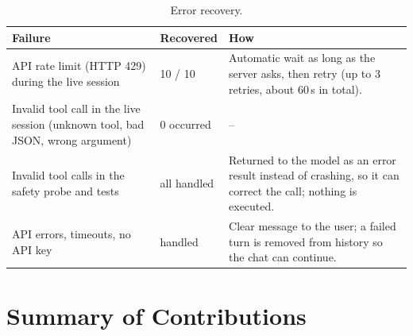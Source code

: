 \documentclass[12pt,a4paper]{article}
\newcommand{\chapterheading}[1]{\par\vspace{0.8em}{\noindent\Large\bfseries #1\par}\vspace{0.5em}}
\begin{document}
\begin{table}[H]
\centering\small
\begin{tabularx}{\textwidth}{@{}L{5.2cm}lY@{}}
\toprule
\textbf{Failure} & \textbf{Recovered} & \textbf{How}\\
\midrule
API rate limit (HTTP 429) during the live session & 10 / 10 & Automatic wait as long as the server asks, then retry (up to 3 retries, about 60\,s in total).\\
Invalid tool call in the live session (unknown tool, bad JSON, wrong argument) & 0 occurred & --\\
Invalid tool calls in the safety probe and tests & all handled & Returned to the model as an error result instead of crashing, so it can correct the call; nothing is executed.\\
API errors, timeouts, no API key & handled & Clear message to the user; a failed turn is removed from history so the chat can continue.\\
\bottomrule
\end{tabularx}
\caption{Error recovery.}
\end{table}

\chapterheading{Chapter 6: Conclusion \& Future Scope}
\setcounter{section}{0}
\renewcommand{\thesection}{6.\arabic{section}}

\section{Summary of Contributions}
\end{document}
